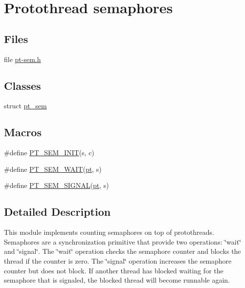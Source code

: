 \hypertarget{group__ptsem}{\section{Protothread semaphores}
\label{group__ptsem}
}
\subsection*{Files}
\begin{DoxyCompactItemize}
\item 
file \hyperlink{pt-sem_8h}{pt-\/sem.\-h}
\end{DoxyCompactItemize}
\subsection*{Classes}
\begin{DoxyCompactItemize}
\item 
struct \hyperlink{structpt__sem}{pt\-\_\-sem}
\end{DoxyCompactItemize}
\subsection*{Macros}
\begin{DoxyCompactItemize}
\item 
\#define \hyperlink{group__ptsem_gad7089c5dc86f12019f0361d82a75b04b}{P\-T\-\_\-\-S\-E\-M\-\_\-\-I\-N\-I\-T}(s, c)
\item 
\#define \hyperlink{group__ptsem_ga386ff87a52a840512906f2940e229e2e}{P\-T\-\_\-\-S\-E\-M\-\_\-\-W\-A\-I\-T}(\hyperlink{structpt}{pt}, s)
\item 
\#define \hyperlink{group__ptsem_ga1eaaf4d9d75e24582acc6440d7085f19}{P\-T\-\_\-\-S\-E\-M\-\_\-\-S\-I\-G\-N\-A\-L}(\hyperlink{structpt}{pt}, s)
\end{DoxyCompactItemize}


\subsection{Detailed Description}
This module implements counting semaphores on top of protothreads. Semaphores are a synchronization primitive that provide two operations\-: \char`\"{}wait\char`\"{} and \char`\"{}signal\char`\"{}. The \char`\"{}wait\char`\"{} operation checks the semaphore counter and blocks the thread if the counter is zero. The \char`\"{}signal\char`\"{} operation increases the semaphore counter but does not block. If another thread has blocked waiting for the semaphore that is signaled, the blocked thread will become runnable again.


